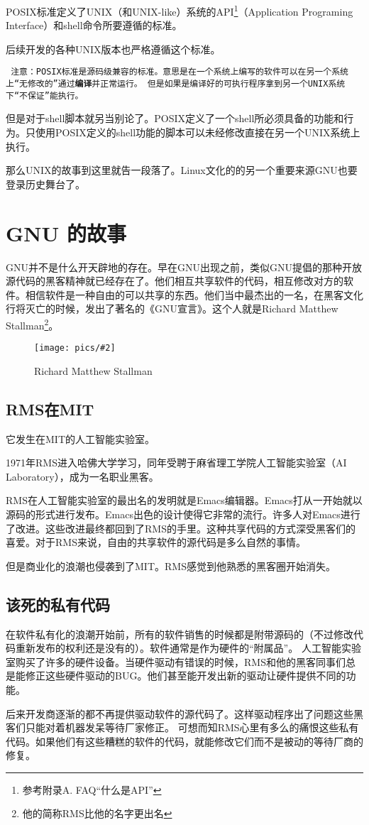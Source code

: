 \documentclass[amstex]{ctexbook}
\newenvironment{notice}{\tt}{}
\newenvironment{insertnote}{ \ttfamily\CJKfamily{KaiTi} }{\vskip 1cm }
\newcommand{\chatu}[3][0.35]{%
\begin{figure}[h]%
\centering%
\texttt{[image: pics/\#2]}%
\caption{#3\label{fig:#2}}%
\end{figure}%
}
\begin{document}
POSIX标准定义了UNIX（和UNIX-like）系统的API\footnote{参考附录A. FAQ“什么是API”}（Application Programing Interface）和shell命令所要遵循的标准。

后续开发的各种UNIX版本也严格遵循这个标准。

\begin{notice}
注意：POSIX标准是源码级兼容的标准。意思是在一个系统上编写的软件可以在另一个系统上“无修改的”通过\textbf{编译}并正常运行。
但是如果是编译好的可执行程序拿到另一个UNIX系统下“不保证”能执行。

但是对于shell脚本就另当别论了。POSIX定义了一个shell所必须具备的功能和行为。只使用POSIX定义的shell功能的脚本可以未经修改直接在另一个UNIX系统上执行。
\end{notice}

那么UNIX的故事到这里就告一段落了。Linux文化的的另一个重要来源GNU也要登录历史舞台了。

\section{GNU 的故事}

GNU并不是什么开天辟地的存在。早在GNU出现之前，类似GNU提倡的那种开放源代码的黑客精神就已经存在了。他们相互共享软件的代码，相互修改对方的软件。相信软件是一种自由的可以共享的东西。他们当中最杰出的一名，在黑客文化行将灭亡的时候，发出了著名的《GNU宣言》。这个人就是Richard Matthew Stallman\footnote{他的简称RMS比他的名字更出名}。

\chatu{rms-full-size}{Richard Matthew Stallman}

\subsection{RMS在MIT}

它发生在MIT的人工智能实验室。

1971年RMS进入哈佛大学学习，同年受聘于麻省理工学院人工智能实验室（AI Laboratory），成为一名职业黑客。

RMS在人工智能实验室的最出名的发明就是Emacs编辑器。Emacs打从一开始就以源码的形式进行发布。Emacs出色的设计使得它非常的流行。许多人对Emacs进行了改进。这些改进最终都回到了RMS的手里。这种共享代码的方式深受黑客们的喜爱。对于RMS来说，自由的共享软件的源代码是多么自然的事情。

但是商业化的浪潮也侵袭到了MIT。RMS感觉到他熟悉的黑客圈开始消失。

\begin{insertnote}
\subsection*{该死的私有代码}
在软件私有化的浪潮开始前，所有的软件销售的时候都是附带源码的（不过修改代码重新发布的权利还是没有的）。软件通常是作为硬件的“附属品”。
人工智能实验室购买了许多的硬件设备。当硬件驱动有错误的时候，RMS和他的黑客同事们总是能修正这些硬件驱动的BUG。他们甚至能开发出新的驱动让硬件提供不同的功能。

后来开发商逐渐的都不再提供驱动软件的源代码了。这样驱动程序出了问题这些黑客们只能对着机器发呆等待厂家修正。
可想而知RMS心里有多么的痛恨这些私有代码。如果他们有这些糟糕的软件的代码，就能修改它们而不是被动的等待厂商的修复。
\end{insertnote}
\end{document}
